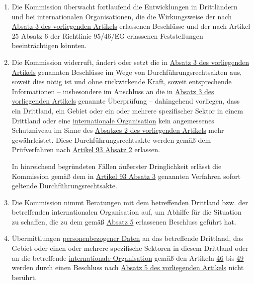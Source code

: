 \begin{enumerate}
  \item Die Kommission überwacht fortlaufend die Entwicklungen in Drittländern und bei internationalen Organisationen,
   die die Wirkungsweise der nach \hyperref[itm:45-3]{Absatz 3 des vorliegenden Artikels} erlassenen Beschlüsse und der
   nach Artikel 25 Absatz 6 der Richtlinie 95/46/EG erlassenen Feststellungen beeinträchtigen könnten.%
  \label{itm:45-4}

  \item Die Kommission widerruft, ändert oder setzt die in \hyperref[itm:45-3]{Absatz 3 des vorliegenden Artikels}
   genannten Beschlüsse im Wege von Durchführungsrechtsakten aus, soweit dies nötig ist und ohne rückwirkende Kraft,
   soweit entsprechende Informationen -- insbesondere im Anschluss an die in \hyperref[itm:45-3]{Absatz 3 des
   vorliegenden Artikels} genannte Überprüfung -- dahingehend vorliegen, dass ein Drittland, ein Gebiet oder ein oder
   mehrere spezifischer Sektor in einem Drittland oder eine \hyperref[itm:04-26]{internationale Organisation} kein
   angemessenes Schutzniveau im Sinne des \hyperref[itm:45-2]{Absatzes 2 des vorliegenden Artikels} mehr gewährleistet.
   Diese Durchführungsrechtsakte werden gemäß dem Prüfverfahren nach \hyperref[itm:93-2]{Artikel 93 Absatz 2}
   erlassen. %
  \label{itm:45-5}

   In hinreichend begründeten Fällen äußerster Dringlichkeit erlässt die Kommission gemäß dem in \hyperref[itm:93-3]
   {Artikel 93 Absatz 3} genannten Verfahren sofort geltende Durchführungsrechtsakte.

  \item Die Kommission nimmt Beratungen mit dem betreffenden Drittland bzw. der betreffenden internationalen
   Organisation auf, um Abhilfe für die Situation zu schaffen, die zu dem gemäß \hyperref[itm:45-5]{Absatz 5}
   erlassenen Beschluss geführt hat.%
  \label{itm:45-6}

  \item Übermittlungen \hyperref[itm:04-1]{personenbezogener Daten} an das betreffende Drittland, das Gebiet oder einen
   oder mehrere spezifische Sektoren in diesem Drittland oder an die betreffende \hyperref[itm:04-26]
   {internationale Organisation} gemäß den Artikeln
   \hyperref[ch:46]{46} bis \hyperref[ch:49]{49} werden durch einen Beschluss nach \hyperref[itm:45-5]{Absatz 5 des
    vorliegenden Artikels} nicht berührt.%
  \label{itm:45-7}


\end{enumerate}
